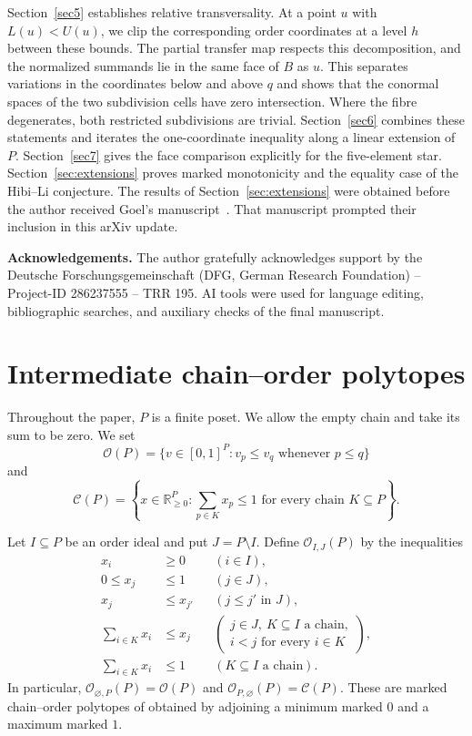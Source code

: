 \documentclass[a4paper,12pt]{amsart}
\theoremstyle{definition}
\theoremstyle{remark}
\newcommand{\OO}{\mathcal O}
\newcommand{\CC}{\mathcal C}
\begin{document}
Section~\ref{sec5} establishes relative transversality.
At a point $u$ with $L(u)<U(u)$, we clip the corresponding order coordinates at a level $h$ between these bounds.
The partial transfer map respects this decomposition, and the normalized summands lie in the same face of $B$ as $u$.
This separates variations in the coordinates below and above $q$ and shows that the conormal spaces of the two subdivision cells have zero intersection.
Where the fibre degenerates, both restricted subdivisions are trivial.
Section~\ref{sec6} combines these statements and iterates the one-coordinate inequality along a linear extension of $P$.
Section~\ref{sec7} gives the face comparison explicitly for the five-element star.
Section~\ref{sec:extensions} proves marked monotonicity and the equality case of the Hibi--Li conjecture.
The results of Section~\ref{sec:extensions} were obtained before the author received Goel's manuscript~\cite{Goe26}.
That manuscript prompted their inclusion in this arXiv update.




\medskip
\noindent\textbf{Acknowledgements.}
The author gratefully acknowledges support by the Deutsche Forschungsgemeinschaft (DFG, German Research Foundation) -- Project-ID 286237555 -- TRR 195.
AI tools were used for language editing, bibliographic searches, and auxiliary checks of the final manuscript.


\section{Intermediate chain--order polytopes}\label{sec2}

Throughout the paper, $P$ is a finite poset.
We allow the empty chain and take its sum to be zero.
We set
\[
 \OO(P)=\{v\in[0,1]^P:v_p\leq v_q\text{ whenever }p\leq q\}
\]
and
\[
 \CC(P)=\left\{x\in\mathbb R_{\geq0}^P: \sum_{p\in K}x_p\leq1\text{ for every chain }K\subseteq P\right\}.
\]

Let $I\subseteq P$ be an order ideal and put $J=P\setminus I$.
Define $\OO_{I,J}(P)$ by the inequalities
\begin{align*}
 x_i&\geq0 &&(i\in I),\\
 0\leq x_j&\leq1 &&(j\in J),\\
 x_j&\leq x_{j'} &&(j\leq j'\text{ in }J),\\
 \sum_{i\in K}x_i&\leq x_j    &&\left(\substack{j\in J,\ K\subseteq I\text{ a chain},\\
 i<j\text{ for every }i\in K}\right),\\
 \sum_{i\in K}x_i&\leq1 &&(K\subseteq I\text{ a chain}).
\end{align*}
In particular, $\OO_{\varnothing,P}(P)=\OO(P)$ and $\OO_{P,\varnothing}(P)=\CC(P)$.
These are marked chain--order polytopes of \cite{FF16,Fan+20} obtained by adjoining a minimum marked $0$ and a maximum marked $1$.
\end{document}
